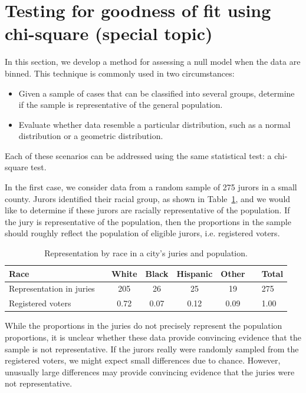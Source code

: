 \section{Testing for goodness of fit using chi-square (special topic)}
\label{oneWayChiSquare}

In this section, we develop a method for assessing a null model when the data are binned.
This technique is commonly used in two circumstances:
\begin{itemize}
\setlength{\itemsep}{0mm}
\item Given a sample of cases that can be classified into several groups, determine if the sample is representative of the general population.
\item Evaluate whether data resemble a particular distribution, such as a normal distribution or a geometric distribution.
\end{itemize}
Each of these scenarios can be addressed using the same statistical test: a chi-square test.


In the first case, we consider data from a random sample of 275 jurors in a small county. Jurors identified their racial group, as shown in Table~\ref{juryRepresentationAndCityRepresentationForRace}, and we would like to determine if these jurors are racially representative of the population.  If the jury is representative of the population, then the proportions in the sample should roughly reflect the population of eligible jurors, i.e. registered voters.

\begin{table}[h]
\centering
\begin{tabular}{ll ccc c ll}
\hline
Race	 & \hspace{2mm} & White & Black & Hispanic & Other & \hspace{2mm} & Total \\
\hline
Representation in juries &	& 205 & 26 & 25 & 19 & & 275 \\
Registered voters	 & 		& 0.72 & 0.07 & 0.12 & 0.09 & & 1.00 \\
\hline
\end{tabular}
\caption{Representation by race in a city's juries and population.}
\label{juryRepresentationAndCityRepresentationForRace}
\end{table}

While the proportions in the juries do not precisely represent the population proportions, it is unclear whether these data provide convincing evidence that the sample is not representative. If the jurors really were randomly sampled from the registered voters, we might expect small differences due to chance. However, unusually large differences may provide convincing evidence that the juries were not representative.


